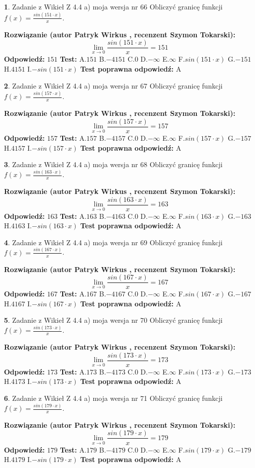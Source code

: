 \documentclass[12pt, a4paper]{article}
\theoremstyle{definition} %
\newtheorem{zad}{}
\newcommand{\zadStart}[1]{\begin{zad}#1\newline}
\newcommand{\zadStop}{\end{zad}}
\newcommand{\rozwStart}[2]{\noindent \textbf{Rozwiązanie (autor #1 , recenzent #2): }\newline}
\newcommand{\rozwStop}{\newline}
\newcommand{\odpStart}{\noindent \textbf{Odpowiedź:}\newline}
\newcommand{\odpStop}{\newline}
\newcommand{\testStart}{\noindent \textbf{Test:}\newline}
\newcommand{\testStop}{\newline}
\newcommand{\kluczStart}{\noindent \textbf{Test poprawna odpowiedź:}\newline}
\newcommand{\kluczStop}{\newline}
\begin{document}
\zadStart{Zadanie z Wikieł Z 4.4 a) moja wersja nr 66}
Obliczyć granicę funkcji $f(x)=\frac{sin(151\cdot x)}{x}$.
\zadStop
\rozwStart{Patryk Wirkus}{Szymon Tokarski}
$$\lim\limits_{x\to 0}\frac{sin(151\cdot x)}{x}=
151$$
\rozwStop
\odpStart
$151$
\odpStop
\testStart
A.$151$
B.$-4151$
C.$0$
D.$-\infty$
E.$\infty$
F.$sin(151\cdot x)$
G.$-151$
H.$4151$
I.$-sin(151\cdot x)$
\testStop
\kluczStart
A
\kluczStop



\zadStart{Zadanie z Wikieł Z 4.4 a) moja wersja nr 67}
Obliczyć granicę funkcji $f(x)=\frac{sin(157\cdot x)}{x}$.
\zadStop
\rozwStart{Patryk Wirkus}{Szymon Tokarski}
$$\lim\limits_{x\to 0}\frac{sin(157\cdot x)}{x}=
157$$
\rozwStop
\odpStart
$157$
\odpStop
\testStart
A.$157$
B.$-4157$
C.$0$
D.$-\infty$
E.$\infty$
F.$sin(157\cdot x)$
G.$-157$
H.$4157$
I.$-sin(157\cdot x)$
\testStop
\kluczStart
A
\kluczStop



\zadStart{Zadanie z Wikieł Z 4.4 a) moja wersja nr 68}
Obliczyć granicę funkcji $f(x)=\frac{sin(163\cdot x)}{x}$.
\zadStop
\rozwStart{Patryk Wirkus}{Szymon Tokarski}
$$\lim\limits_{x\to 0}\frac{sin(163\cdot x)}{x}=
163$$
\rozwStop
\odpStart
$163$
\odpStop
\testStart
A.$163$
B.$-4163$
C.$0$
D.$-\infty$
E.$\infty$
F.$sin(163\cdot x)$
G.$-163$
H.$4163$
I.$-sin(163\cdot x)$
\testStop
\kluczStart
A
\kluczStop



\zadStart{Zadanie z Wikieł Z 4.4 a) moja wersja nr 69}
Obliczyć granicę funkcji $f(x)=\frac{sin(167\cdot x)}{x}$.
\zadStop
\rozwStart{Patryk Wirkus}{Szymon Tokarski}
$$\lim\limits_{x\to 0}\frac{sin(167\cdot x)}{x}=
167$$
\rozwStop
\odpStart
$167$
\odpStop
\testStart
A.$167$
B.$-4167$
C.$0$
D.$-\infty$
E.$\infty$
F.$sin(167\cdot x)$
G.$-167$
H.$4167$
I.$-sin(167\cdot x)$
\testStop
\kluczStart
A
\kluczStop



\zadStart{Zadanie z Wikieł Z 4.4 a) moja wersja nr 70}
Obliczyć granicę funkcji $f(x)=\frac{sin(173\cdot x)}{x}$.
\zadStop
\rozwStart{Patryk Wirkus}{Szymon Tokarski}
$$\lim\limits_{x\to 0}\frac{sin(173\cdot x)}{x}=
173$$
\rozwStop
\odpStart
$173$
\odpStop
\testStart
A.$173$
B.$-4173$
C.$0$
D.$-\infty$
E.$\infty$
F.$sin(173\cdot x)$
G.$-173$
H.$4173$
I.$-sin(173\cdot x)$
\testStop
\kluczStart
A
\kluczStop



\zadStart{Zadanie z Wikieł Z 4.4 a) moja wersja nr 71}
Obliczyć granicę funkcji $f(x)=\frac{sin(179\cdot x)}{x}$.
\zadStop
\rozwStart{Patryk Wirkus}{Szymon Tokarski}
$$\lim\limits_{x\to 0}\frac{sin(179\cdot x)}{x}=
179$$
\rozwStop
\odpStart
$179$
\odpStop
\testStart
A.$179$
B.$-4179$
C.$0$
D.$-\infty$
E.$\infty$
F.$sin(179\cdot x)$
G.$-179$
H.$4179$
I.$-sin(179\cdot x)$
\testStop
\kluczStart
A
\kluczStop
\end{document}
